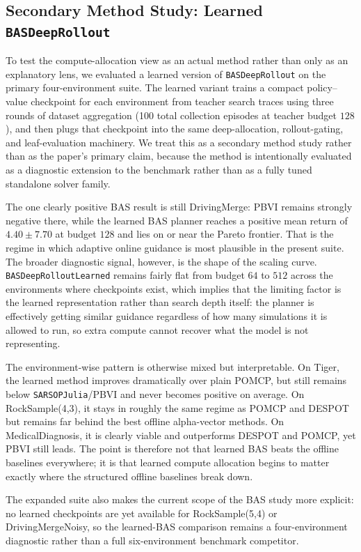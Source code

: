 \documentclass[10pt,twocolumn]{article}
\begin{document}
\subsection{Secondary Method Study: Learned \texttt{BASDeepRollout}}
To test the compute-allocation view as an actual method rather than only as an explanatory lens, we evaluated a learned version of \texttt{BASDeepRollout} on the primary four-environment suite. The learned variant trains a compact policy--value checkpoint for each environment from teacher search traces using three rounds of dataset aggregation (100 total collection episodes at teacher budget $128$), and then plugs that checkpoint into the same deep-allocation, rollout-gating, and leaf-evaluation machinery. We treat this as a secondary method study rather than as the paper's primary claim, because the method is intentionally evaluated as a diagnostic extension to the benchmark rather than as a fully tuned standalone solver family.

The one clearly positive BAS result is still DrivingMerge: PBVI remains strongly negative there, while the learned BAS planner reaches a positive mean return of $4.40\pm7.70$ at budget $128$ and lies on or near the Pareto frontier. That is the regime in which adaptive online guidance is most plausible in the present suite. The broader diagnostic signal, however, is the shape of the scaling curve. \texttt{BASDeepRolloutLearned} remains fairly flat from budget $64$ to $512$ across the environments where checkpoints exist, which implies that the limiting factor is the learned representation rather than search depth itself: the planner is effectively getting similar guidance regardless of how many simulations it is allowed to run, so extra compute cannot recover what the model is not representing.

The environment-wise pattern is otherwise mixed but interpretable. On Tiger, the learned method improves dramatically over plain POMCP, but still remains below \texttt{SARSOPJulia}/PBVI and never becomes positive on average. On RockSample(4,3), it stays in roughly the same regime as POMCP and DESPOT but remains far behind the best offline alpha-vector methods. On MedicalDiagnosis, it is clearly viable and outperforms DESPOT and POMCP, yet PBVI still leads. The point is therefore not that learned BAS beats the offline baselines everywhere; it is that learned compute allocation begins to matter exactly where the structured offline baselines break down.

The expanded suite also makes the current scope of the BAS study more explicit: no learned checkpoints are yet available for RockSample(5,4) or DrivingMergeNoisy, so the learned-BAS comparison remains a four-environment diagnostic rather than a full six-environment benchmark competitor.
\end{document}
